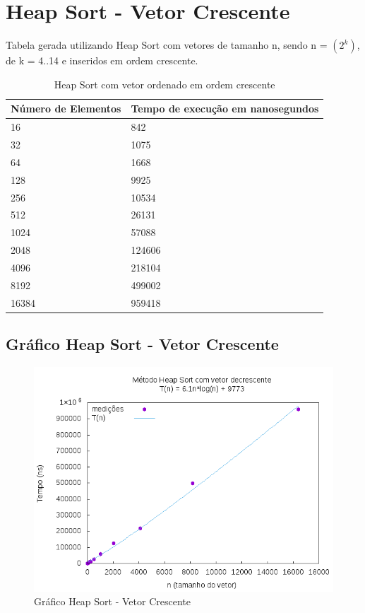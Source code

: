 \documentclass[12pt,a4paper,twoside]{report}
\begin{document}
\section{Heap Sort - Vetor Crescente}
Tabela gerada utilizando Heap Sort com vetores de tamanho n, sendo n = $(2^k)$, de k = 4..14 e inseridos em ordem crescente.
\begin{table}[H]
\centering
\caption{Heap Sort com vetor ordenado em ordem crescente}
\label{my-label}
\begin{tabular}{|l|l|}
\hline
\multicolumn{1}{|c|}{\textbf{Número de Elementos}} & \multicolumn{1}{c|}{\textbf{Tempo de execução em nanosegundos}} \\ \hline
16 & 842 \\ \hline
32 & 1075 \\ \hline
64 & 1668 \\ \hline
128 & 9925 \\ \hline
256 & 10534 \\ \hline
512 & 26131 \\ \hline
1024 & 57088 \\ \hline
2048 & 124606 \\ \hline
4096 & 218104 \\ \hline
8192 & 499002 \\ \hline
16384 & 959418 \\ \hline
\end{tabular}
\end{table}

\subsection{Gráfico Heap Sort - Vetor Crescente}
\begin{figure}[H]
    \centering
    \includegraphics[width=0.7\linewidth]{graficos/HeapSort/vIntCrescente/vIntCrescente.png}
  \caption{Gráfico Heap Sort - Vetor Crescente}
\end{figure}
\end{document}
